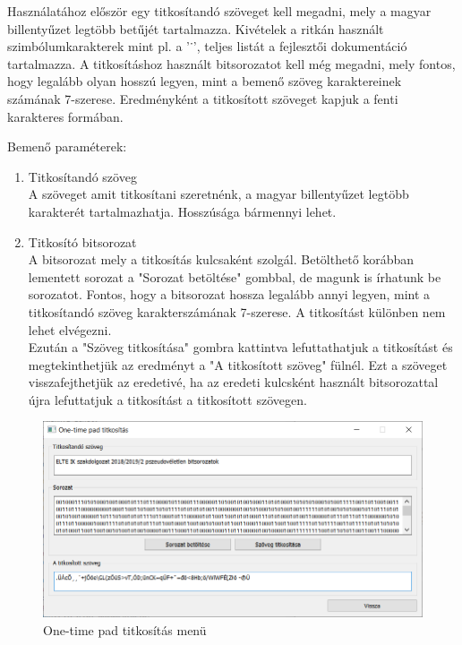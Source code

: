 \documentclass[12pt]{article}
\begin{document}
	Használatához először egy titkosítandó szöveget kell megadni, mely a magyar billentyűzet legtöbb betűjét tartalmazza. Kivételek a ritkán használt szimbólumkarakterek mint pl. a '˙', teljes listát a fejlesztői dokumentáció tartalmazza. A titkosításhoz használt bitsorozatot kell még megadni, mely fontos, hogy legalább olyan hosszú legyen, mint a bemenő szöveg karaktereinek számának 7-szerese. Eredményként a titkosított szöveget kapjuk a fenti karakteres formában.
	
	Bemenő paraméterek:
	\begin{enumerate}
		\bfseries \item Titkosítandó szöveg \\
		\normalfont A szöveget amit titkosítani szeretnénk, a magyar billentyűzet legtöbb karakterét tartalmazhatja. Hosszúsága bármennyi lehet.
		\bfseries \item Titkosító bitsorozat \\
		\normalfont A bitsorozat mely a titkosítás kulcsaként szolgál. Betölthető korábban lementett sorozat a "Sorozat betöltése" gombbal, de magunk is írhatunk be sorozatot. Fontos, hogy a bitsorozat hossza legalább annyi legyen, mint a titkosítandó szöveg karakterszámának 7-szerese. A titkosítást különben nem lehet elvégezni. \\
		Ezután a "Szöveg titkosítása" gombra kattintva lefuttathatjuk a titkosítást és megtekinthetjük az eredményt a "A titkosított szöveg" fülnél. Ezt a szöveget visszafejthetjük az eredetivé, ha az eredeti kulcsként használt bitsorozattal újra lefuttatjuk a titkosítást a titkosított szövegen.
	\end{enumerate}
	\begin{figure}[h]
		\centering
		\begin{minipage}{\textwidth} %
			\includegraphics[width=\textwidth]{onetimepadmenu.png}
		\end{minipage}
		\caption{One-time pad titkosítás menü}
	\end{figure}
	\newpage
\end{document}
